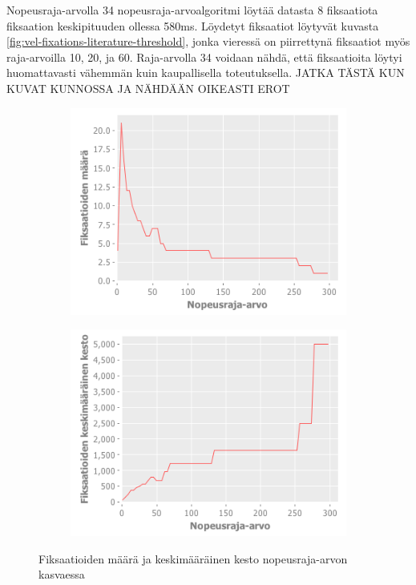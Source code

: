 Nopeusraja-arvolla 34 nopeusraja-arvoalgoritmi löytää datasta 8 fiksaatiota fiksaation keskipituuden ollessa 580ms. Löydetyt fiksaatiot löytyvät kuvasta \ref {fig:vel-fixations-literature-threshold}, jonka vieressä on piirrettynä fiksaatiot myös raja-arvoilla 10, 20, ja 60. Raja-arvolla 34 voidaan nähdä, että fiksaatioita löytyi huomattavasti vähemmän kuin kaupallisella toteutuksella. JATKA TÄSTÄ KUN KUVAT KUNNOSSA JA NÄHDÄÄN OIKEASTI EROT

\begin{figure}[H]
		\begin{subfigure}{.5\textwidth}
    \includegraphics[width=1.0\textwidth]{velocity-threshold-chart.png}
		\end{subfigure}%
		\begin{subfigure}{.5\textwidth}
    \includegraphics[width=1.0\textwidth]{velocity-threshold-avg-chart.png}
		\end{subfigure}%
		
		\caption{Fiksaatioiden määrä ja keskimääräinen kesto nopeusraja-arvon kasvaessa}
		\label{fig:velocity-threshold-avg-chart}
\end{figure}


